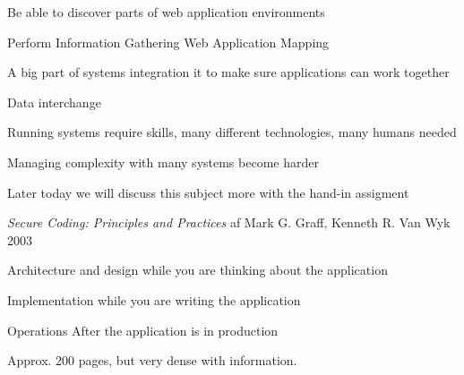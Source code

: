 \documentclass[Screen16to9,17pt]{foils}
\begin{document}


\begin{list1}
\item Be able to discover parts of web application environments
\item Perform Information Gathering Web Application Mapping
\end{list1}












\begin{list2}
\item A big part of systems integration it to make sure applications can work together
\item Data interchange
\item Running systems require skills, many different technologies, many humans needed
\item Managing complexity with many systems become harder
\end{list2}

Later today we will discuss this subject more with the hand-in assigment



{\emph{Secure Coding: Principles and Practices} af Mark G. Graff, Kenneth R. Van Wyk 2003}

\begin{list2}
\item Architecture and design while you are thinking about the application
\item Implementation while you are writing the application
\item Operations After the application is in production
\item Approx. 200 pages, but very dense with information.
\end{list2}


\end{document}

